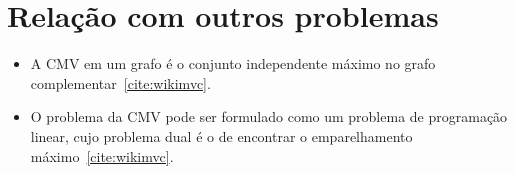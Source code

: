 \section{Relação com outros problemas}
\label{sec:relacao}

\begin{itemize}
    \item A CMV em um grafo é o conjunto independente
    máximo no grafo complementar~\ref{cite:wikimvc}.

    \item O problema da CMV pode ser formulado como um problema de programação
    linear, cujo problema dual é o de encontrar o emparelhamento
    máximo~\ref{cite:wikimvc}.
\end{itemize}


